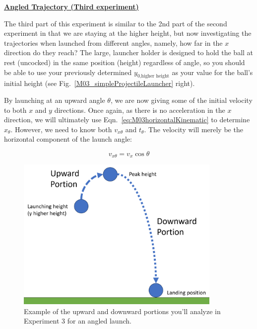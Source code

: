 \underline{\textbf{Angled Trajectory (Third experiment)}}




The third part of this experiment is similar to the 2nd part of the second experiment in that we are staying at the higher height, but now investigating the trajectories when launched from different angles, namely, how far in the $x$ direction do they reach? The large, launcher holder is designed to hold the ball at rest (uncocked) in the same position (height) regardless of angle, so you should be able to use your previously determined $y_{0\text{,higher height}}$ as your value for the ball's initial height (see Fig.~\ref{M03_simpleProjectileLauncher} right).

By launching at an upward angle $\theta$, we are now giving some of the initial velocity to both $x$ and $y$ directions. Once again, as there is no acceleration in the $x$ direction, we will ultimately use Eqn.~\ref{eq:M03horizontalKinematic} to determine $x_{\theta}$. However, we need to know both $v_{x\theta}$ and $t_{\theta}$. The velocity will merely be the horizontal component of the launch angle:


 \begin{equation}
  \label{eq:M03Kinematic_horizontal_velocity_03}
    v_{x\theta} = v_{x}\cos{\theta} 
\end{equation}

\begin{figure}[h]
  \begin{center}
    \includegraphics[width=3.9in]{Fall/Experiment03FiguresNEW/M3_Exp3.png}
  \end{center}
  \caption{Example of the upward and downward portions you'll analyze in Experiment 3 for an angled launch.}
  \label{M03_simpleProjectileLauncher_Exp3}
\end{figure}


